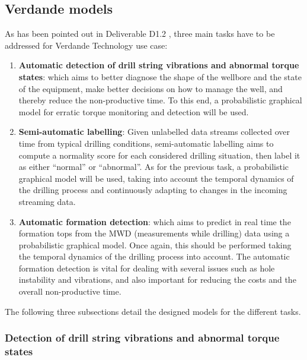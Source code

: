 
\subsection{Verdande models} \label{Section:VerdandeModels}

As has been pointed out in Deliverable D1.2 \cite{Fer14b}, three main tasks have to be addressed for Verdande Technology use case:

\begin{enumerate}
\item \textbf{Automatic detection of drill string vibrations and abnormal torque states}: which aims to better diagnose the shape of the wellbore and the state of the equipment, make better decisions on how to manage the well, and thereby reduce the non-productive time. To this end, a probabilistic graphical model for erratic torque monitoring and detection will be used.

\item \textbf{Semi-automatic labelling}: Given unlabelled data streams collected over time from typical drilling conditions, semi-automatic labelling aims to compute a normality score for each considered drilling situation, then label it as either ``normal'' or ``abnormal''. As for the previous task, a probabilistic graphical model will be used, taking into account the temporal dynamics of the drilling process and continuously adapting to changes in the incoming streaming data. 

\item \textbf{Automatic formation detection}: which aims to predict in real time the formation tops from the MWD (measurements while drilling) data using a probabilistic graphical model. Once again, this should be performed taking the temporal dynamics of the drilling process into account. The automatic formation detection is vital for dealing with several issues such as hole instability and vibrations, and also important for reducing the costs and the overall non-productive time.
\end{enumerate}

The following three subsections detail the designed models for the different tasks.

\subsubsection{Detection of drill string vibrations and abnormal torque states}\label{SubSection:DetectionTorque}

